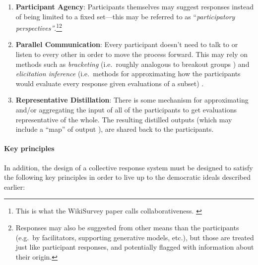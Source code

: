 \documentclass[sigconf,authorversion,nonacm,linkcolor=blue,colorlinks]{acmart}
\def\tightlist{} %
\begin{document}
\begin{enumerate}
\tightlist
\item
  \textbf{Participant Agency}: Participants themselves may suggest responses instead of being limited to a fixed set---this may be referred to as ``\emph{participatory perspectives''}.\footnote{This is what the WikiSurvey paper calls collaborativeness. \cite{salganikWikiSurveysOpen2015a}}\footnote{Responses may also be suggested from other means than the participants (e.g.~by facilitators, supporting generative models, etc.), but those are treated just like participant responses, and potentially flagged with information about their origin.} 
\item
  \textbf{Parallel Communication}: Every participant doesn't need to talk to or listen to every other in order to move the process forward. This may rely on methods such as \emph{bracketing} (i.e.~roughly analogous to breakout groups \cite{PSi}) and \emph{elicitation inference} (i.e.~methods for approximating how the participants would evaluate every response given evaluations of a subset) \cite{konya2022elicitation}.
\item
  \textbf{Representative Distillation}: There is some mechanism for approximating and/or aggregating the input of all of the participants to get evaluations representative of the whole. The resulting distilled outputs (which may include a ``map'' of output \cite{smallPolis2021}), are shared back to the participants.
\end{enumerate}

\label{key-principles}\paragraph{Key principles} In addition, the design of a collective response system must be designed to satisfy the following key principles in order to live up to the democratic ideals described earlier:
\end{document}

